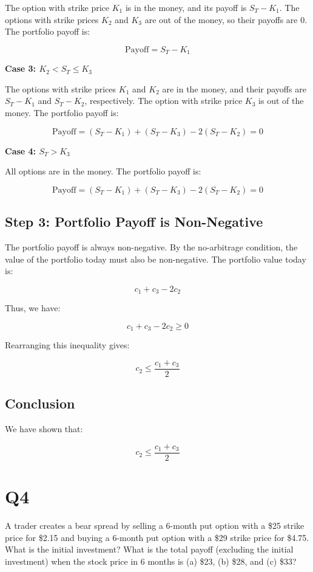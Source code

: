 \documentclass[12pt,letterpaper, onecolumn]{exam}
\begin{document}
The option with strike price \( K_1 \) is in the money, and its payoff is \( S_T - K_1 \). The options with strike prices \( K_2 \) and \( K_3 \) are out of the money, so their payoffs are 0. The portfolio payoff is:

\[
\text{Payoff} = S_T - K_1
\]

\textbf{Case 3: \( K_2 < S_T \leq K_3 \)}

The options with strike prices \( K_1 \) and \( K_2 \) are in the money, and their payoffs are \( S_T - K_1 \) and \( S_T - K_2 \), respectively. The option with strike price \( K_3 \) is out of the money. The portfolio payoff is:

\[
\text{Payoff} = (S_T - K_1) + (S_T - K_3) - 2(S_T - K_2) = 0
\]

\textbf{Case 4: \( S_T > K_3 \)}

All options are in the money. The portfolio payoff is:

\[
\text{Payoff} = (S_T - K_1) + (S_T - K_3) - 2(S_T - K_2) = 0
\]

\subsection*{Step 3: Portfolio Payoff is Non-Negative}

The portfolio payoff is always non-negative. By the no-arbitrage condition, the value of the portfolio today must also be non-negative. The portfolio value today is:

\[
c_1 + c_3 - 2c_2
\]

Thus, we have:

\[
c_1 + c_3 - 2c_2 \geq 0
\]

Rearranging this inequality gives:

\[
c_2 \leq \frac{c_1 + c_3}{2}
\]

\subsection*{Conclusion}

We have shown that:

\[
c_2 \leq \frac{c_1 + c_3}{2}
\]


    \newpage


    
\section*{Q4}

A trader creates a bear spread by selling a 6-month put option with a \$25 strike price for \$2.15 and buying a 6-month put option with a \$29 strike price for \$4.75. What is the initial investment? What is the total payoff (excluding the initial investment) when the stock price in 6 months is (a) \$23, (b) \$28, and (c) \$33?
\end{document}
